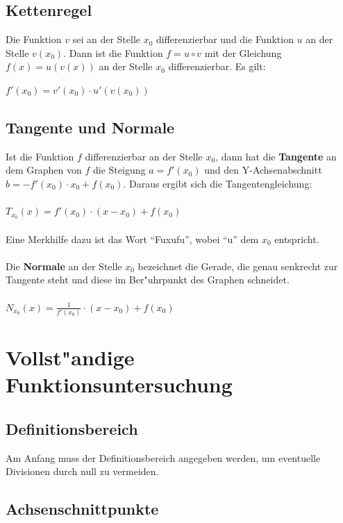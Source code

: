 \subsection{Kettenregel}

Die Funktion $v$ sei an der Stelle $x_{0}$ differenzierbar und die Funktion $u$ an der Stelle $v(x_{0})$. Dann ist die Funktion $f=u\circ v$ mit der Gleichung $f(x)= u(v(x))$ an der Stelle $x_{0}$ differenzierbar. Es gilt:

$f'(x_{0})=v'(x_{0})\cdot u'(v(x_{0}))$


\subsection{Tangente und Normale}

Ist die Funktion $f$ differenzierbar an der Stelle $x_{0}$, dann hat die \textbf{Tangente} an dem Graphen von $f$ die Steigung $a=f'(x_{0})$ und den Y-Achsenabschnitt $b=-f'(x_{0})\cdot x_{0}+f(x_{0})$. Daraus ergibt sich die Tangentengleichung:\\
\\
$T_{x_{0}}(x)=f'(x_{0})\cdot (x-x_{0})+f(x_{0}) $ \\
\\
Eine Merkhilfe dazu ist das Wort "`Fuxufu"', wobei "`u"' dem $x_{0}$ entspricht.\\
\\
Die \textbf{Normale} an der Stelle $x_{0}$ bezeichnet die Gerade, die genau senkrecht zur Tangente steht und diese im Ber"uhrpunkt des Graphen schneidet.\\
\\
$N_{x_{0}}(x)=\frac{1}{f'(x_{0})}\cdot (x-x_{0})+f(x_{0})$\\


\section{Vollst"andige Funktionsuntersuchung}


\subsection{Definitionsbereich}

Am Anfang muss der Definitionsbereich angegeben werden, um eventuelle Divisionen durch null zu vermeiden. \\


\subsection{Achsenschnittpunkte}

